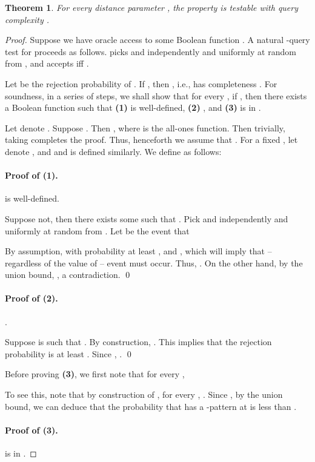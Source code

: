 \documentclass[11pt,english]{article}
\newtheorem{theorem}{Theorem}
\theoremstyle{definition}
\theoremstyle{remark}
\begin{document}
\begin{theorem}\label{thm:100} 
For every distance parameter , the property  is testable 
with query complexity .
\end{theorem} 
\begin{proof} 
Suppose we have oracle access to some Boolean function . 
A natural -query test  for  proceeds as follows. 
 picks  and  independently and uniformly at random from , 
and accepts iff . 

Let  be the rejection probability of .
If , then , i.e.,  has completeness . 
For soundness, in a series of steps, we shall show that  
for every , if , then there exists 
a Boolean function  such that {\bf (1)}  is well-defined, {\bf (2)} , and 
{\bf (3)}  is in .

Let  denote . 
Suppose . Then , 
where  is the all-ones function. 
Then trivially, taking  completes the proof.  
Thus, henceforth we assume that .
\vskip10pt
For a fixed , let  denote , and 
and  is defined similarly. We define  as follows: 


\paragraph{Proof of (1).}  is well-defined. 

Suppose not, then there exists some  such that .
Pick  and  independently and uniformly at random from .
Let  be the event that 


By assumption, with probability at least ,  and , 
which will imply that -- regardless of the value of  -- event  must occur.
Thus, . 
On the other hand, by the union bound, , a contradiction.
\qed

\paragraph{Proof of (2).} .

Suppose  is such that .
By construction, .
This implies that the rejection probability  is at least . 
Since , .
\qed

\vskip13pt
Before proving {\bf(3)}, we first note that for every ,
\label{eq:g low violation}

To see this, note that by construction of , 
for every , .
Since , by the union bound, we can deduce that the probability that 
 has a -pattern at  is less than .

\paragraph{Proof of (3).}  is in .


\end{proof}
\end{document}
